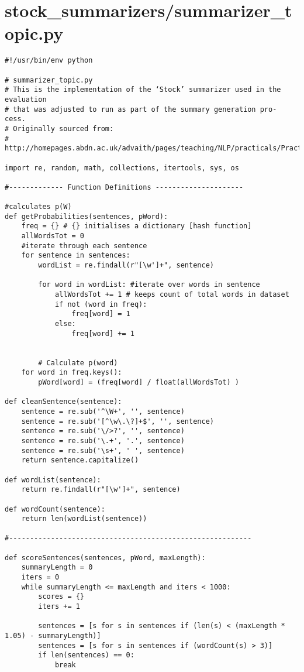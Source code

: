 \documentclass{article}
\begin{document}
\section*{stock\_summarizers/summarizer\_topic.py}
\begin{verbatim}
#!/usr/bin/env python

# summarizer_topic.py
# This is the implementation of the ‘Stock’ summarizer used in the evaluation
# that was adjusted to run as part of the summary generation pro- cess.
# Originally sourced from:
# http://homepages.abdn.ac.uk/advaith/pages/teaching/NLP/practicals/Practical3.zip

import re, random, math, collections, itertools, sys, os

#------------- Function Definitions ---------------------

#calculates p(W)
def getProbabilities(sentences, pWord):
    freq = {} # {} initialises a dictionary [hash function]
    allWordsTot = 0
    #iterate through each sentence
    for sentence in sentences:
        wordList = re.findall(r"[\w']+", sentence)

        for word in wordList: #iterate over words in sentence
            allWordsTot += 1 # keeps count of total words in dataset
            if not (word in freq):
                freq[word] = 1
            else:
                freq[word] += 1


        # Calculate p(word)
    for word in freq.keys():
        pWord[word] = (freq[word] / float(allWordsTot) )

def cleanSentence(sentence):
    sentence = re.sub('^\W+', '', sentence)
    sentence = re.sub('[^\w\.\?]+$', '', sentence)
    sentence = re.sub('\/>?', '', sentence)
    sentence = re.sub('\.+', '.', sentence)
    sentence = re.sub('\s+', ' ', sentence)
    return sentence.capitalize()

def wordList(sentence):
    return re.findall(r"[\w']+", sentence)

def wordCount(sentence):
    return len(wordList(sentence))

#----------------------------------------------------------

def scoreSentences(sentences, pWord, maxLength):
    summaryLength = 0
    iters = 0
    while summaryLength <= maxLength and iters < 1000:
        scores = {}
        iters += 1

        sentences = [s for s in sentences if (len(s) < (maxLength * 1.05) - summaryLength)]
        sentences = [s for s in sentences if (wordCount(s) > 3)]
        if len(sentences) == 0:
            break


\end{verbatim}
\end{document}
